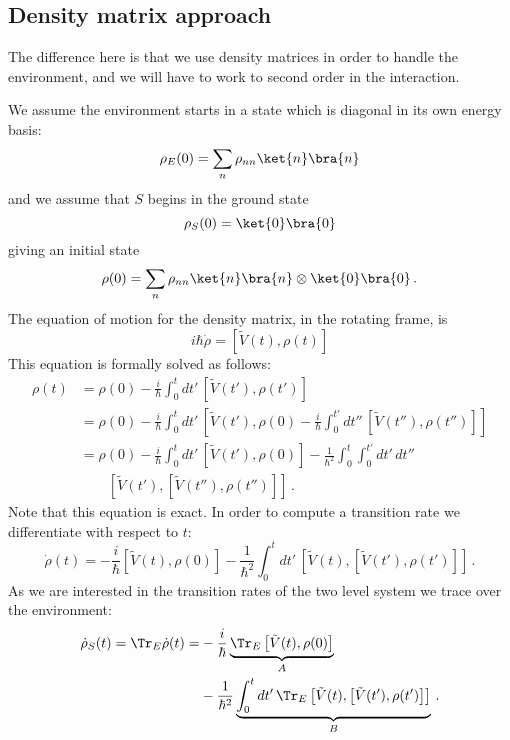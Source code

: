 \subsection{Density matrix approach}

The difference here is that we use density matrices in order to handle the environment, and we will have to work to second order in the interaction.

We assume the environment starts in a state which is diagonal in its own energy basis:
\begin{equation}
\rho_E(0) = \sum_n \rho_{nn} \ket{n}\bra{n}
\end{equation}
and we assume that $S$ begins in the ground state
\begin{equation}
\rho_S(0) = \ket{0}\bra{0}
\end{equation}
giving an initial state
\begin{equation}
\rho(0) = \sum_n \rho_{nn} \ket{n}\bra{n} \otimes \ket{0}\bra{0} \, .
\end{equation}
The equation of motion for the density matrix, in the rotating frame, is
\begin{equation}
i \hbar \dot{\rho} = \left[ \tilde{V}(t), \rho(t) \right]
\end{equation}
This equation is formally solved as follows:
\begin{align}
\rho(t)
&= \rho(0) - \frac{i}{\hbar}
\int_0^t dt' \, \left[ \tilde{V}(t'), \rho(t') \right] \\
&= \rho(0) - \frac{i}{\hbar}
\int_0^t dt' \, \left[ \tilde{V}(t'), \rho(0) - \frac{i}{\hbar} \int_0^{t'} dt'' \, \left[ \tilde{V}(t''), \rho(t'') \right] \right] \\
&= \rho(0) - \frac{i}{\hbar} \int_0^{t} dt' \, \left[ \tilde{V}(t'), \rho(0) \right]
- \frac{1}{\hbar^2} \int_0^{t} \int_0^{t'} dt' \, dt'' \nonumber \\
& \qquad \left[ \tilde{V}(t'), \left[ \tilde{V}(t''), \rho(t'') \right] \right] \, .
\end{align}
Note that this equation is exact.
In order to compute a transition rate we differentiate with respect to $t$:
\begin{equation}
\dot{\rho}(t)
= -\frac{i}{\hbar} \left[ \tilde{V}(t), \rho(0) \right]
- \frac{1}{\hbar^2} \int_0^t dt' \, \left[ \tilde{V}(t), \left[ \tilde{V}(t'), \rho(t') \right] \right] \, .
\end{equation}
As we are interested in the transition rates of the two level system we trace over the environment:
\begin{align}
\dot{\rho}_S(t) = 
\Tr_E \dot{\rho}(t) =
&-\frac{i}{\hbar} \underbrace{ \Tr_E \left[ \tilde{V}(t), \rho(0) \right] }_{A} \nonumber \\
&- \frac{1}{\hbar^2} \underbrace{ \int_0^t dt' \, \Tr_E \left[ \tilde{V}(t), \left[ \tilde{V}(t'), \rho(t') \right] \right]}_{B} \, .
\end{align}


